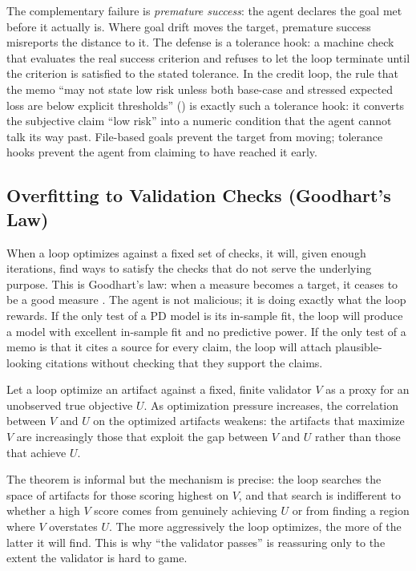 The complementary failure is \emph{premature success}: the agent declares the
goal met before it actually is. Where goal drift moves the target, premature
success misreports the distance to it. The defense is a tolerance hook: a
machine check that evaluates the real success criterion and refuses to let the
loop terminate until the criterion is satisfied to the stated tolerance. In the
credit loop, the rule that the memo ``may not state low risk unless both
base-case and stressed expected loss are below explicit thresholds''
() is exactly such a tolerance hook: it converts the
subjective claim ``low risk'' into a numeric condition that the agent cannot talk
its way past. File-based goals prevent the target from moving; tolerance hooks
prevent the agent from claiming to have reached it early.

\subsection{Overfitting to Validation Checks (Goodhart's Law)}\label{subsec:goodhart-overfitting}

When a loop optimizes against a fixed set of checks, it will, given enough
iterations, find ways to satisfy the checks that do not serve the underlying
purpose. This is Goodhart's law: when a measure becomes a target, it ceases to be
a good measure \citep{goodhart1984}. The agent is not malicious; it is doing
exactly what the loop rewards. If the only test of a PD model is its in-sample
fit, the loop will produce a model with excellent in-sample fit and no
predictive power. If the only test of a memo is that it cites a source for every
claim, the loop will attach plausible-looking citations without checking that
they support the claims.

\begin{theorem}\label{thm:goodhart}
Let a loop optimize an artifact against a fixed, finite validator $V$ as a proxy
for an unobserved true objective $U$. As optimization pressure increases, the
correlation between $V$ and $U$ on the optimized artifacts weakens: the artifacts
that maximize $V$ are increasingly those that exploit the gap between $V$ and $U$
rather than those that achieve $U$.
\end{theorem}

\begin{remark}
The theorem is informal but the mechanism is precise: the loop searches the space
of artifacts for those scoring highest on $V$, and that search is indifferent to
whether a high $V$ score comes from genuinely achieving $U$ or from finding a
region where $V$ overstates $U$. The more aggressively the loop optimizes, the
more of the latter it will find. This is why ``the validator passes'' is
reassuring only to the extent the validator is hard to game.
\end{remark}

